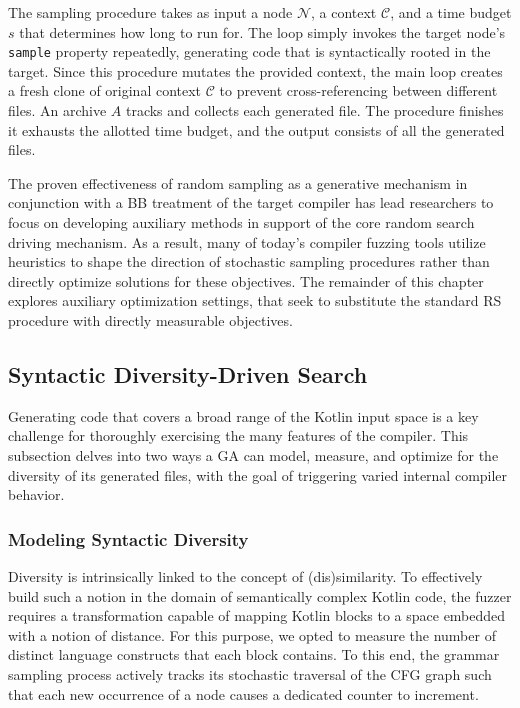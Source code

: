 The sampling procedure takes as input a node $\mathcal{N}$, a context $\mathcal{C}$, 
and a time budget $s$ that determines how long to run for.
The loop simply invokes the target node's \texttt{sample} property repeatedly,
generating code that is syntactically rooted in the target.
Since this procedure mutates the provided context, the main loop creates a fresh
clone of original context $\mathcal{C}$ to prevent cross-referencing between
different files.
An archive $A$ tracks and collects each generated file.
The procedure finishes it exhausts the allotted time budget,
and the output consists of all the generated files.

The proven effectiveness of random sampling as a generative mechanism
in conjunction with a \gls{BB} treatment of the target compiler
has lead researchers to focus on developing auxiliary methods
in support of the core random search driving mechanism.
As a result, many of today's compiler fuzzing tools utilize heuristics to shape
the direction of stochastic sampling procedures rather than directly
optimize solutions for these objectives.
The remainder of this chapter explores auxiliary optimization settings,
that seek to substitute the standard \gls{RS} procedure
with directly measurable objectives.

\subsection{\label{subsec:diversity-ga}Syntactic Diversity-Driven Search}

Generating code that covers a broad range of the Kotlin
input space is a key challenge for thoroughly exercising the many features
of the compiler.
This subsection delves into two ways a \gls{GA} can model, measure,
and optimize for the diversity of its generated files, with the goal
of triggering varied internal compiler behavior.

\subsubsection{\label{subsec:model-div} Modeling Syntactic Diversity} Diversity is intrinsically linked to the
concept of (dis)similarity.
To effectively build such a notion in the domain of semantically
complex Kotlin code, the fuzzer requires a transformation capable
of mapping Kotlin blocks to a space embedded with
a notion of distance.
For this purpose, we opted to measure the number of distinct
language constructs that each block contains.
To this end, the grammar sampling process actively tracks
its stochastic traversal of the \gls{CFG} graph such that
each new occurrence of a node causes a dedicated counter to increment.

